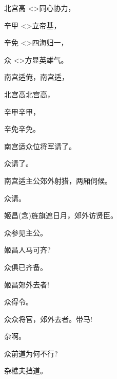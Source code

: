 {北宫高\hspace{20pt} \textless{}\!\textgreater{}同心协力，

辛甲\hspace{30pt} \textless{}\!\textgreater{}立帝基，

辛免\hspace{30pt} \textless{}\!\textgreater{}四海归一，

众\hspace{41pt} \textless{}\!\textgreater{}方显英雄气。

南宫适\hspace{20pt}俺，南宫适，

北宫高\hspace{20pt}北宫高，

辛甲\hspace{30pt}辛甲，

辛免\hspace{30pt}辛免。

南宫适\hspace{20pt}众位将军请了。

众\hspace{41pt}请了。

南宫适\hspace{20pt}主公郊外射猎，两厢伺候。

众\hspace{41pt}请。

姬昌\hspace{30pt}({\akai 念})旌旗遮日月，郊外访贤臣。

众\hspace{41pt}参见主公。

姬昌\hspace{30pt}人马可齐?

众\hspace{41pt}俱已齐备。

姬昌\hspace{30pt}郊外去者!

众\hspace{41pt}得令。

众\hspace{41pt}众将官，郊外去者。带马!

杂\hspace{41pt}啊。

众\hspace{41pt}前道为何不行?

杂\hspace{41pt}樵夫挡道。

}
